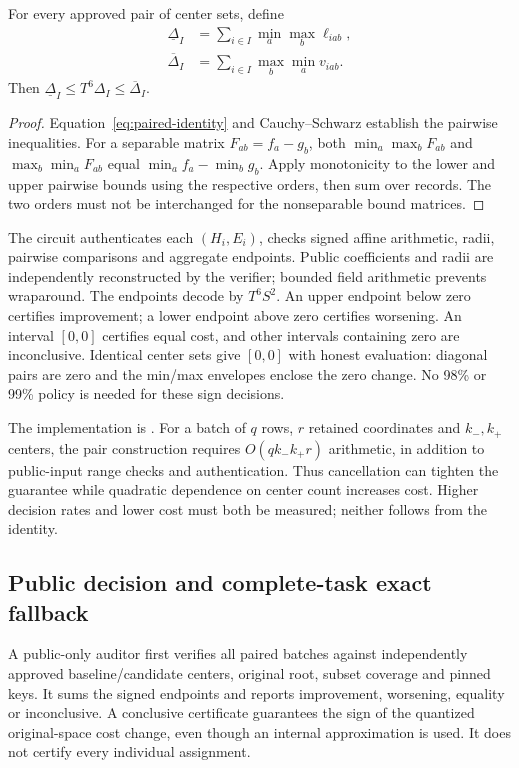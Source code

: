 \begin{proposition}\label{prop:paired-envelope}
For every approved pair of center sets, define
\begin{align}
\underline\Delta_I&=\sum_{i\in I}\min_a\max_b\ell_{iab},\nonumber\\
\overline\Delta_I&=\sum_{i\in I}\max_b\min_a v_{iab}.\label{eq:paired-envelope}
\end{align}
Then $\underline\Delta_I\le T^6\Delta_I\le\overline\Delta_I$.
\end{proposition}
\begin{proof}
Equation~\eqref{eq:paired-identity} and Cauchy--Schwarz establish the pairwise
inequalities. For a separable matrix $F_{ab}=f_a-g_b$, both
$\min_a\max_b F_{ab}$ and $\max_b\min_a F_{ab}$ equal
$\min_a f_a-\min_b g_b$. Apply monotonicity to the lower and upper pairwise
bounds using the respective orders, then sum over records. The two orders
must not be interchanged for the nonseparable bound matrices.
\end{proof}

The circuit authenticates each $(H_i,E_i)$, checks signed affine arithmetic,
radii, pairwise comparisons and aggregate endpoints. Public coefficients and
radii are independently reconstructed by the verifier; bounded field arithmetic
prevents wraparound. The endpoints decode by $T^6S^2$. An upper endpoint below
zero certifies improvement; a lower endpoint above zero certifies worsening.
An interval $[0,0]$ certifies equal cost, and other intervals containing zero
are inconclusive. Identical center sets give $[0,0]$ with honest evaluation:
diagonal pairs are zero and the min/max envelopes enclose the zero change.
No 98\% or 99\% policy is needed for these sign decisions.

The implementation is .
For a batch of $q$ rows, $r$ retained coordinates and $k_-,k_+$ centers, the
pair construction requires $O(qk_-k_+r)$ arithmetic, in addition to public-input
range checks and authentication. Thus cancellation can tighten the guarantee
while quadratic dependence on center count increases cost. Higher decision
rates and lower cost must both be measured; neither follows from the identity.

\subsection{Public decision and complete-task exact fallback}\label{sec:paired-fallback}
A public-only auditor first verifies all paired batches against independently
approved baseline/candidate centers, original root, subset coverage and pinned
keys. It sums the signed endpoints and reports improvement, worsening, equality
or inconclusive. A conclusive certificate guarantees the sign of the quantized
original-space cost change, even though an internal approximation is used. It
does not certify every individual assignment.

